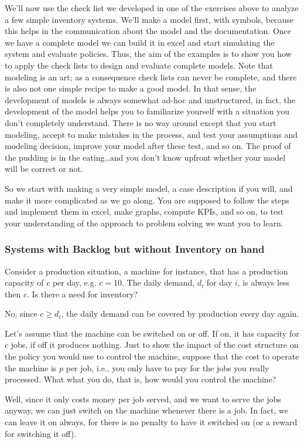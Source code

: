 We'll now use the check list we developed in one of the exercises
above to analyze a few simple inventory systems. We'll make a model
first, with symbols, because this helps in the communication about the
model and the documentation. Once we have a complete model we can
build it in excel and start simulating the system and evaluate
policies. Thus, the aim of the examples is to show you how to apply
the check lists to design and evaluate complete models. Note that
modeling is an art; as a consequence check lists can never be
complete, and there is also not one simple recipe to make a good
model. In that sense, the development of models is always somewhat
ad-hoc and unstructured, in fact, the development of the model helps
you to familiarize yourself with a situation you don't completely
understand. There is no way around except that you start modeling,
accept to make mistakes in the process, and test your assumptions and
modeling decision, improve your model after these test, and so on. The
proof of the pudding is in the eating\ldots and you don't know upfront
whether your model will be correct or not.

So we start with making a very simple model, a case description if you
will, and make it more complicated as we go along.  You are supposed
to follow the steps and implement them in excel, make graphs, compute
KPIs, and so on, to test your understanding of the approach to problem
solving we want you to learn.

\subsubsection{Systems with Backlog but without Inventory on hand}

\begin{question}
  Consider a production situation, a  machine for instance, that has a
  production capacity of  $c$ per day, e.g. $c=10$.  The daily demand,
  $d_i$ for day $i$, is always less then $c$. Is there a need for inventory?
  \begin{solution}
No, since $c\geq d_i$, the daily demand can be covered by production every day again.     
  \end{solution}
\end{question}

\begin{question}
  Let's assume that the machine can be switched on or off.  If on, it
  has capacity for $c$ jobs, if off it produces nothing.  Just to show
  the impact of the cost structure on the policy you would use to
  control the machine, suppose that the cost to operate the machine is
  $p$ per job, i.e., you only have to pay for the jobs you really
  processed. What what you do, that is, how would you control the
  machine?
  \begin{solution}
    Well, since it only costs money per job served, and we want to
    serve the jobs anyway, we can just switch on the machine whenever
    there is a job. In fact, we can leave it on always, for there is
    no penalty to have it switched on (or a reward for switching it
    off).
  \end{solution}
\end{question}

